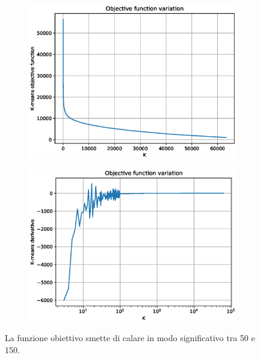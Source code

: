 \documentclass[
	11pt, %
	a4paper, %
	oneside, %
	headinclude,footinclude, %
	BCOR5mm, %
]{scrartcl}
\begin{document}
		\begin{figure}[!htb]
			\hspace{-1cm}
			\begin{subfigure}{.5\textwidth}
				\centering
				\includegraphics[scale=.5]{../results/KMeans.eps}
			\end{subfigure}
			\hspace{0.5cm}
			\begin{subfigure}{.5\textwidth}
				\centering
				\includegraphics[scale=.5]{../results/KMeansDerivative.eps}
			\end{subfigure}
			\caption{La funzione obiettivo smette di calare in modo significativo tra 50 e 150.}
			\label{fig:KMeansObj}
		\end{figure}
\end{document}
